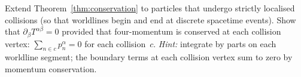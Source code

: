 \begin{exercise}\label{ex:conservation-collision}
  Extend Theorem~\ref{thm:conservation} to particles that undergo
  strictly localised collisions (so that worldlines begin and end
  at discrete spacetime events).  Show that $\partial_\beta
  T^{\alpha\beta} = 0$ provided that four-momentum is conserved
  at each collision vertex: $\sum_{n\in c} p_n^\alpha = 0$ for
  each collision~$c$.
  \emph{Hint:} integrate by parts on each worldline segment;
  the boundary terms at each collision vertex sum to zero by
  momentum conservation.
\end{exercise}
